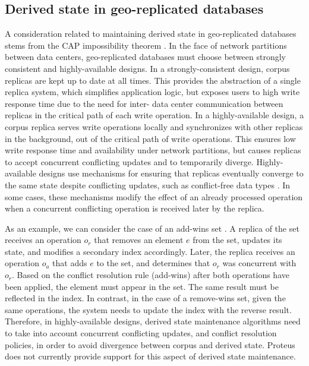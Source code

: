 \subsection{Derived state in geo-replicated databases}
\label{sec:discuss_geo_replication}
A consideration related to maintaining derived state in geo-replicated databases stems from the CAP impossibility theorem \cite{brewer:cap}.
In the face of network partitions between data centers,
geo-replicated databases must choose between strongly consistent and highly-available designs.
In a strongly-consistent design, corpus replicas are kept up to date at all times.
This provides the abstraction of a single replica system, which simplifies application logic, but exposes users to high
write response time due to the need for inter- data center communication between replicas in the critical path of each write operation.
In a highly-available design, a corpus replica serves write operations locally
and synchronizes with other replicas in the background, out of the critical path of write operations.
This ensures low write response time and availability under network partitions,
but causes replicas to accept concurrent conflicting updates and to temporarily diverge.
Highly-available designs use mechanisms for ensuring that replicas eventually converge to the same state despite
conflicting updates, such as conflict-free data types \cite{Shapiro2011CRDTs}.
In some cases, these mechanisms modify the effect of an already processed operation when a concurrent conflicting operation
is received later by the replica.

As an example, we can consider the case of an add-wins set \cite{rep:syn:sh138}.
A replica of the set receives an operation $o_r$ that removes an element $e$ from the set, updates its state,
and modifies a secondary index accordingly.
Later, the replica receives an operation $o_a$ that adds $e$ to the set,
and determines that $o_r$ was concurrent with $o_r$.
Based on the conflict resolution rule (add-wins) after both operations have been applied, the element must appear in the set.
The same result must be reflected in the index.
In contrast, in the case of a remove-wins set, given the same operations,
the system needs to update the index with the reverse result.
Therefore, in highly-available designs, derived state maintenance algorithms need to take into account concurrent conflicting updates,
and conflict resolution policies, in order to avoid divergence between corpus and derived state.
Proteus does not currently provide support for this aspect of derived state maintenance.